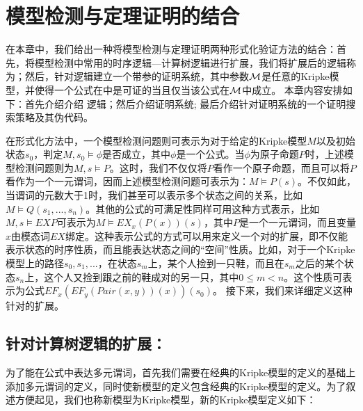 \chapter{模型检测与定理证明的结合}\label{chapt:sctl}
在本章中，我们给出一种将模型检测与定理证明两种形式化验证方法的结合：首先，将模型检测中常用的时序逻辑---计算树逻辑\CTL{}进行扩展，我们将扩展后的逻辑称为\CTLP{}；然后，针对\CTLP{}逻辑建立一个带参的证明系统\sctlm{}，其中参数$\cal M$是任意的Kripke模型，并使得一个\CTLP{}公式在\sctlm{}中是可证的当且仅当该公式在$\cal M$中成立。
本章内容安排如下：首先介绍介绍\CTLP{} 逻辑；然后介绍证明系统\SCTL{}; 最后介绍针对证明系统\SCTL{}的一个证明搜索策略及其伪代码。


在形式化方法中，一个\CTL{}模型检测问题则可表示为对于给定的Kripke模型$M$以及初始状态$s_0$，判定$M,s_0\models \phi$是否成立，其中$\phi$是一个\CTL{}公式。当$\phi$为原子命题$P$时，上述\CTL{}模型检测问题则为$M,s\models P$。这时，我们不仅仅将$P$看作一个原子命题，而且可以将$P$看作为一个一元谓词，因而上述模型检测问题可表示为：$M\models P(s)$。不仅如此，当谓词的元数大于1时，我们甚至可以表示多个状态之间的关系，比如$M\models Q(s_1,...,s_n)$。其他的\CTL{}公式的可满足性同样可用这种方式表示，比如$M,s\models EX P$可表示为$M\models EX_x(P(x))(s)$，其中$P$是一个一元谓词，而且变量$x$由模态词$EX$绑定。这种表示\CTL{}公式的方式可以用来定义一个对\CTL{}的扩展，即不仅能表示状态的时序性质，而且能表达状态之间的“空间”性质。比如，对于一个Kripke模型上的路径$s_0,s_1,...$，在状态$s_m$上，某个人捡到一只鞋，而且在$s_m$之后的某个状态$s_n$上，这个人又捡到跟之前的鞋成对的另一只，其中$0\le m<n$。这个性质可表示为公式$EF_x(EF_y(Pair(x,y))(x))(s_0)$。
接下来，我们来详细定义这种针对\CTL{}的扩展。

\section{针对计算树逻辑\CTL{}的扩展：\CTLP{}}\label{sec:ctlp}
为了能在公式中表达多元谓词，首先我们需要在经典的Kripke模型的定义的基础上添加多元谓词的定义，同时使新模型的定义包含经典的Kripke模型的定义。为了叙述方便起见，我们也称新模型为Kripke模型，新的Kripke模型定义如下：

